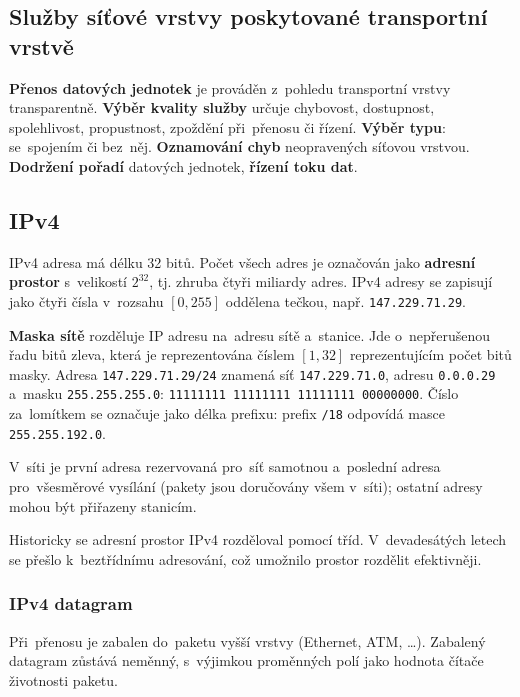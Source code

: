 \subsection{Služby síťové vrstvy poskytované transportní vrstvě}

\textbf{Přenos datových jednotek} je prováděn z~pohledu transportní vrstvy transparentně. \textbf{Výběr kvality služby} určuje chybovost, dostupnost, spolehlivost, propustnost, zpoždění při~přenosu či řízení. \textbf{Výběr typu}: se~spojením či bez~něj. \textbf{Oznamování chyb} neopravených síťovou vrstvou. \textbf{Dodržení pořadí} datových jednotek, \textbf{řízení toku dat}.

\subsection{IPv4}

IPv4 adresa má délku 32 bitů. Počet všech adres je označován jako \textbf{adresní prostor} s~velikostí $2^{32}$, tj. zhruba čtyři miliardy adres. IPv4 adresy se zapisují jako čtyři čísla v~rozsahu $[0, 255]$ oddělena tečkou, např. \texttt{147.229.71.29}.

\textbf{Maska sítě} rozděluje IP adresu na~adresu sítě a~stanice. Jde o~nepřerušenou řadu bitů zleva, která je reprezentována číslem $[1, 32]$ reprezentujícím počet bitů masky. Adresa \texttt{147.229.71.29/24} znamená síť \texttt{147.229.71.0}, adresu \texttt{0.0.0.29} a~masku \texttt{255.255.255.0}: \texttt{11111111 11111111 11111111 00000000}. Číslo za~lomítkem se označuje jako délka prefixu: prefix \texttt{/18} odpovídá masce \texttt{255.255.192.0}.

V~síti je první adresa rezervovaná pro~síť samotnou a~poslední adresa pro~všesměrové vysílání (pakety jsou doručovány všem v~síti); ostatní adresy mohou být přiřazeny stanicím.

Historicky se adresní prostor IPv4 rozděloval pomocí tříd. V~devadesátých letech se přešlo k~beztřídnímu adresování, což umožnilo prostor rozdělit efektivněji.



\subsubsection{IPv4 datagram}

Při~přenosu je zabalen do~paketu vyšší vrstvy (Ethernet, ATM, \dots). Zabalený datagram zůstává neměnný, s~výjimkou proměnných polí jako hodnota čítače životnosti paketu.

